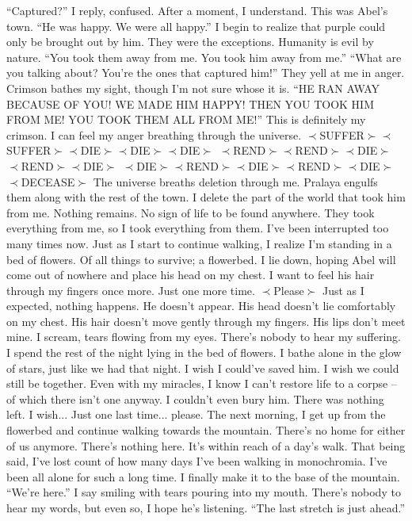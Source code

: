 \documentclass[openany, 12pt]{book}
\newcommand\tab[1][1cm]{\hspace*{#1}}
\begin{document}
\newline
\tab
``Captured?'' I reply, confused. After a moment, I understand. This was Abel’s town. ``He was happy. We were all happy.'' I begin to realize that purple could only be brought out by him. They were the exceptions. Humanity is evil by nature. ``You took them away from me. You took him away from me.''
\newline
\tab
``What are you talking about? You’re the ones that captured him!'' They yell at me in anger. Crimson bathes my sight, though I’m not sure whose it is.
\newline
\tab
``HE RAN AWAY BECAUSE OF YOU! WE MADE HIM HAPPY! THEN YOU TOOK HIM FROM ME! YOU TOOK THEM ALL FROM ME!'' This is definitely my crimson. I can feel my anger breathing through the universe. 
\newline
$\prec$SUFFER$\succ$$\prec$SUFFER$\succ$$\prec$DIE$\succ$$\prec$DIE$\succ$$\prec$DIE$\succ$
\newline
$\prec$REND$\succ$$\prec$REND$\succ$$\prec$DIE$\succ$$\prec$REND$\succ$$\prec$DIE$\succ$
\newline
$\prec$DIE$\succ$$\prec$REND$\succ$$\prec$DIE$\succ$$\prec$REND$\succ$$\prec$DIE$\succ$
\newline
\tab\tab$\prec$DECEASE$\succ$
\newline
The universe breaths deletion through me. Pralaya engulfs them along with the rest of the town. I delete the part of the world that took him from me. Nothing remains. No sign of life to be found anywhere. They took everything from me, so I took everything from them. I’ve been interrupted too many times now. Just as I start to continue walking, I realize I’m standing in a bed of flowers. Of all things to survive; a flowerbed. I lie down, hoping Abel will come out of nowhere and place his head on my chest. I want to feel his hair through my fingers once more. Just one more time.
\newline
$\prec$Please$\succ$
\newline
\tab
Just as I expected, nothing happens. He doesn’t appear. His head doesn’t lie comfortably on my chest. His hair doesn’t move gently through my fingers. His lips don’t meet mine. I scream, tears flowing from my eyes. There’s nobody to hear my suffering. I spend the rest of the night lying in the bed of flowers.
\newline
\tab
I bathe alone in the glow of stars, just like we had that night. I wish I could’ve saved him. I wish we could still be together. Even with my miracles, I know I can’t restore life to a corpse -- of which there isn’t one anyway.  I couldn’t even bury him. There was nothing left. I wish... Just one last time... please.
\newline
\tab
The next morning, I get up from the flowerbed and continue walking towards the mountain. There’s no home for either of us anymore. There’s nothing here. It’s within reach of a day’s walk. That being said, I’ve lost count of how many days I’ve been walking in monochromia. I’ve been all alone for such a long time.
\newline
\tab
I finally make it to the base of the mountain. ``We’re here.'' I say smiling with tears pouring into my mouth. There’s nobody to hear my words, but even so, I hope he’s listening. ``The last stretch is just ahead.'' 
\end{document}
